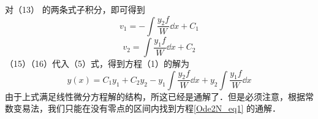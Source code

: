 对（13）%
的两条式子积分，即可得到
\begin{equation}
v_1 =  - \int \frac{y_2 f}{W} \dd{x}  + C_1
\end{equation}
\begin{equation}
v_2 = \int \frac{y_1 f}{W} \dd{x}  + C_2
\end{equation}
（15）（16）代入（5）式，得到方程（1）的解为 %
\begin{equation}
y(x) = C_1 y_1 + C_2 y_2 - y_1 \int \frac{y_2 f}{W} \dd{x} + y_2 \int \frac{y_1 f}{W} \dd{x}
\end{equation}
由于上式满足线性微分方程解的结构，所这已经是通解了．但是必须注意，根据常数变易法，我们只能在没有零点的区间内找到方程\autoref{Ode2N_eq1} 的通解．
